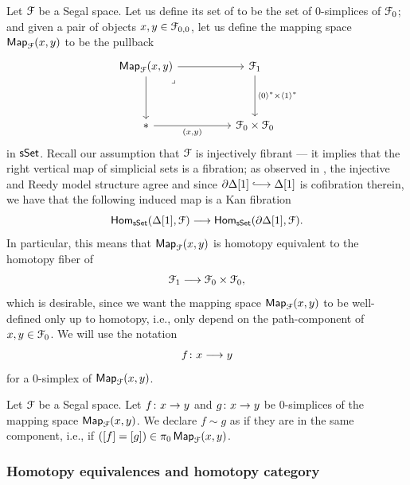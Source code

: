 \begin{construction}
    \label{ch2:: cons: objects mapping space}
    Let $\mathcal F$ be a Segal space. Let us define its set of  to be the set of $0$-simplices of $\mathcal F_0$; and given a pair of objects $x,y\in \mathcal F_{0,0}$, let us define the mapping space $\operatorname{\sf Map}_{\mathcal F}(x,y)$ to be the pullback
    \begin{equation}
        \begin{tikzcd}
            {\Map_{\cF}(x,y)} && {\cF_{1}} \\
            \\
            {*} && {\cF_{0}\times \cF_{0}}
            \arrow[from=1-1, to=1-3]
            \arrow[from=1-1, to=3-1]
            \arrow["\lrcorner"{anchor=center, pos=0.125}, draw=none, from=1-1, to=3-3]
            \arrow["\lag 0\rag^* \times \lag 1 \rag^*", from=1-3, to=3-3]
            \arrow["{(x,y)}"', from=3-1, to=3-3]
        \end{tikzcd}
    \end{equation}
    in $\operatorname{\sf sSet}$. Recall our assumption that $\mathcal F$ is injectively fibrant — it implies that the right vertical map of simplicial sets is a fibration; as observed in , the injective and Reedy model structure agree and since $\partial \Delta[1] \longhookra \Delta[1]$ is cofibration therein, we have that the following induced map is a Kan fibration
    \[\operatorname{\sf Hom}_{\operatorname{\sf sSet}}(\Delta[1], \mathcal F) \longrightarrow \operatorname{\sf Hom}_{\operatorname{\sf sSet}}(\partial \Delta[1], \mathcal F).\]
    In particular, this means that $\operatorname{{\sf Map}}_{\mathcal F}(x,y)$ is homotopy equivalent to the homotopy fiber of \[\mathcal F_1 \longrightarrow \mathcal F_0 \times \mathcal F_0,\] which is desirable, since we want the mapping space $\operatorname{{\sf Map}}_{\mathcal F}(x,y)$ to be well-defined only up to homotopy, i.e., only depend on the path-component of $x,y\in \mathcal F_0$. We will use the notation
    \begin{equation}
        f \colon x \longrightarrow y
    \end{equation}
    for a 0-simplex of $\operatorname{{\sf Map}}_{\mathcal F}(x,y)$.
\end{construction}

\begin{definition}
    Let $\mathcal F$ be a Segal space. Let $f\colon x \rightarrow y$ and $g\colon x \rightarrow y$ be 0-simplices of the mapping space $\operatorname{{\sf Map}}_{\mathcal F}(x,y)$. We declare $f \sim g$ as  if they are in the same component, i.e., if $([f] = [g]) \in \pi_0 \operatorname{{\sf Map}}_{\mathcal F}(x,y)$.
\end{definition}

\subsubsection{Homotopy equivalences and homotopy category}

